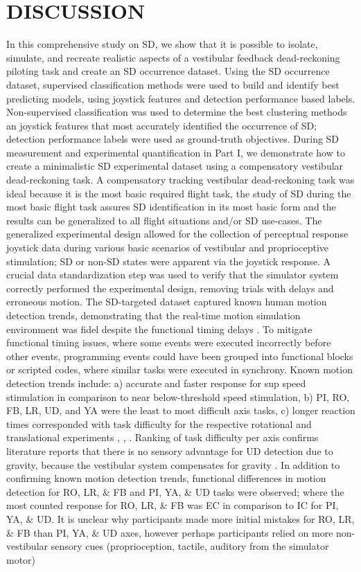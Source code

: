 \documentclass{ieeeaccess}
\begin{document}
\section{DISCUSSION}
In this comprehensive study on SD, we show that it is possible to isolate, simulate, and recreate realistic aspects of a vestibular feedback dead-reckoning piloting task and create an SD occurrence dataset. Using the SD occurrence dataset, supervised classification methods were used to build and identify best predicting models, using joystick features and detection performance based labels. Non-supervised classification was used to determine the best clustering methods an joystick features that most accurately identified the occurrence of SD; detection performance labels were used as ground-truth objectives. During SD measurement and experimental quantification in Part I, we demonstrate how to create a minimalistic SD experimental dataset using a compensatory vestibular dead-reckoning task. A compensatory tracking vestibular dead-reckoning task was ideal because it is the most basic required flight task, the study of SD during the most basic flight task assures SD identification in its most basic form and the results can be generalized to all flight situations and/or SD use-cases. The generalized experimental design allowed for the collection of perceptual response joystick data during various basic scenarios of vestibular and proprioceptive stimulation; SD or non-SD states were apparent via the joystick response. A crucial data standardization step was used to verify that the simulator system correctly performed the experimental design, removing trials with delays and erroneous motion. The SD-targeted dataset captured known human motion detection trends, demonstrating that the real-time motion simulation environment was fidel despite the functional timing delays \cite{Stoffregen_2003_Nature}. To mitigate functional timing issues, where some events were executed incorrectly before other events, programming events could have been grouped into functional blocks or scripted codes, where similar tasks were executed in synchrony. Known motion detection trends include: a) accurate and faster response for sup speed stimulation in comparison to near below-threshold speed stimulation, b) PI, RO, FB, LR, UD, and YA were the least to most difficult axis tasks, c) longer reaction times corresponded with task difficulty for the respective rotational and translational experiments \cite{Valko_2012_Vestibular}, \cite{Hartmann_2014_Direction}, \cite{Karmali_2017_Multivariate}. Ranking of task difficulty per axis confirms literature reports that there is no sensory advantage for UD detection due to gravity, because the vestibular system compensates for gravity \cite{Valko_2012_Vestibular}. In addition to confirming known motion detection trends, functional differences in motion detection for RO, LR, \& FB and PI, YA, \& UD tasks were observed; where the most counted response for RO, LR, \& FB was EC in comparison to IC for PI, YA, \& UD. It is unclear why participants made more initial mistakes for RO, LR, \& FB than PI, YA, \& UD axes, however perhaps participants relied on more non-vestibular sensory cues (proprioception, tactile, auditory from the simulator motor) 
\end{document}
